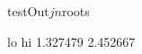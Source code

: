 \begin{Schunk}
\begin{Sinput}
 testOut$jn$roots
\end{Sinput}
\begin{Soutput}
      lo       hi 
1.327479 2.452667 
\end{Soutput}
\end{Schunk}
